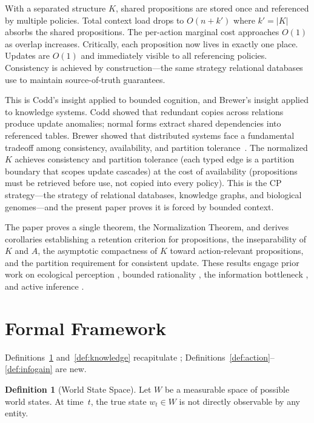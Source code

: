 \documentclass[11pt]{article}
\theoremstyle{definition}
\newtheorem{definition}{Definition}
\theoremstyle{remark}
\begin{document}
With a separated structure $K$, shared propositions are stored once and
referenced by multiple policies. Total context load drops to
$O(n + k')$ where $k' = |K|$ absorbs the shared propositions. The
per-action marginal cost approaches $O(1)$ as overlap increases.
Critically, each proposition now lives in exactly one place. Updates
are $O(1)$ and immediately visible to all referencing policies.
Consistency is achieved by construction---the same strategy relational
databases use to maintain source-of-truth guarantees.

This is Codd's insight \cite{Codd1970} applied to bounded cognition,
and Brewer's insight \cite{Brewer2000} applied to knowledge systems.
Codd showed that redundant copies across relations produce update
anomalies; normal forms extract shared dependencies into referenced
tables. Brewer showed that distributed systems face a fundamental
tradeoff among consistency, availability, and partition
tolerance~\cite{Gilbert2002}. The normalized $K$ achieves consistency
and partition tolerance (each typed edge is a partition boundary that
scopes update cascades) at the cost of availability (propositions must
be retrieved before use, not copied into every policy). This is the
CP strategy---the strategy of relational databases, knowledge graphs,
and biological genomes---and the present paper proves it is forced by
bounded context.

The paper proves a single theorem, the Normalization Theorem, and
derives corollaries establishing a retention criterion for propositions,
the inseparability of $K$ and $A$, the asymptotic compactness of $K$
toward action-relevant propositions, and the partition requirement for
consistent update. These results engage prior work on
ecological perception \cite{Gibson1979}, bounded rationality
\cite{Simon1955}, the information bottleneck \cite{Tishby2000,
Tishby2011}, and active inference \cite{Friston2010,
ParrPezzuloFriston2022}.

\section{Formal Framework}
\label{sec:framework}

Definitions~\ref{def:world} and~\ref{def:knowledge} recapitulate
\cite{McCarthy2026a}; Definitions~\ref{def:action}--\ref{def:infogain}
are new.

\begin{definition}[World State Space]
\label{def:world}
Let $W$ be a measurable space of possible world states. At time~$t$, the
true state $w_t \in W$ is not directly observable by any entity.
\end{definition}
\end{document}
